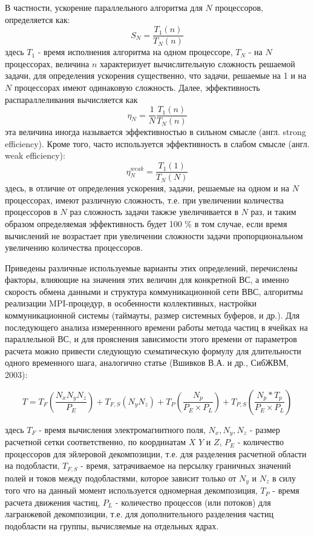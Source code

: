 В частности, ускорение параллельного алгоритма для $N$ процессоров, определяется как:
$$
S_N = \frac{T_1(n)}{T_N(n)}
$$  
здесь $T_1$ - время исполнения алгоритма на одном процессоре, $T_N$ - на $N$ процессорах, величина $n$ характеризует вычислительную сложность решаемой задачи, для определения ускорения существенно, что задачи, решаемые на 1 и на $N$ процессорах имеют одинаковую сложность.
Далее, эффективность распараллеливания вычисляется как
$$
\eta_N = \frac{1}{N}\frac{T_1(n)}{T_N(n)}
$$  
эта величина иногда называется эффективностью в сильном смысле (англ. strong efficiency). Кроме того, часто используется эффективность в слабом смысле (англ. weak efficiency):
\begin{equation}
\label{weak_eff}
\eta^{weak}_N = \frac{T_1(1)}{T_N(N)}
\end{equation}
здесь, в отличие от определения ускорения, задачи, решаемые на одном и на $N$ процессорах, имеют различную сложность, т.е. при увеличении количества процессоров в $N$ раз сложность задачи такжэе увеличивается в $N$ раз, и таким образом определяемая эффективность будет 100 \% в том случае, если время вычислений не возрастает при увеличении сложности задачи пропорциональном увеличению количества процессоров.   

Приведены различные используемые варианты этих определений, перечислены факторы, влияющие на  значения этих величин для конкретной ВС, а именно скорость обмена данными и структура коммуникационной сети ВВС, алгоритмы реализации MPI-процедур, в особенности коллективных, настройки коммуникационной системы (таймауты, размер системных буферов, и др.).
Для последующего анализа измереннного времени работы метода частиц в ячейках на параллельной ВС, и для прояснения зависимости этого времени от параметров расчета можно привести следующую схематическую формулу для длительности одного временного шага, аналогично статье (Вшивков В.А. и др., СибЖВМ, 2003):

\begin{equation}
\label{PIC-timestep}
T=T_{F} \left ( \frac{N_x N_y N_z }{P_E}\right )+ T_{F,S}\left (N_y N_z\right ) + T_P\left(\frac{N_p}{P_E\times P_L}\right) +T_{P,S}\left (\frac{N_p*T_p}{P_E\times P_L}\right)
\end{equation}

здесь $T_{F}$ - время вычисления электромагнитного поля, $N_x, N_y, N_z$ - размер расчетной сетки соответственно, по координатам $X$ $Y$ и $Z$, $P_E$ - количество процессоров для эйлеровой декомпозиции, т.е. для разделения расчетной области на подобласти, $T_{F,S}$ - время, затрачиваемое на персылку граничных значений полей и токов между подобластями, которое зависит только от $N_y$ и $N_z$ в силу того что на данный момент используется одномерная декомпозиция,  $T_P$ - время расчета движения частиц, $P_L$ - количество процессов (или потоков) для лагранжевой декомпозиции, т.е. для дополнительного разделения частиц подобласти на группы, вычисляемые на отдельных ядрах.


